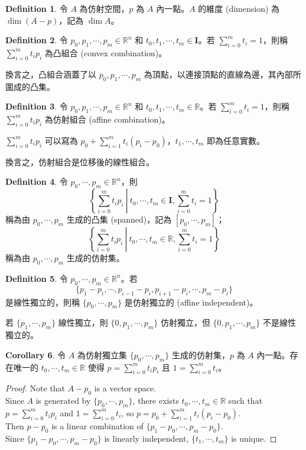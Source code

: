 \documentclass[12pt]{article}
\theoremstyle{definition}
\newtheorem{definition}{Definition}[section]
\newtheorem{corollary}[definition]{Corollary}
\newcommand\<{\langle}
\renewcommand\>{\rangle}
\begin{document}
\begin{CJK}{UTF8}{bsmi}
\begin{definition}
    令 $A$ 為仿射空間，$p$ 為 $A$ 內一點。$A$ 的維度 (dimension) 為 $\dim(A-p)$，記為 $\dim A$。
\end{definition}

\begin{definition}
    令 $p_0, p_1, \cdots, p_m\in\mathbb{R}^n$ 和 $t_0, t_1, \cdots, t_m\in\textbf{I}$。若 $\sum_{i=0}^m t_i=1$，則稱 $\sum_{i=0}^m t_i p_i$ 為凸組合 (convex combination)。
\end{definition}

換言之，凸組合涵蓋了以 $p_0, p_1, \cdots, p_m$ 為頂點，以連接頂點的直線為邊，其內部所圍成的凸集。

\begin{definition}
    令 $p_0, p_1, \cdots, p_m\in\mathbb{R}^n$ 和 $t_0, t_1, \cdots, t_m\in\mathbb{R}$。若 $\sum_{i=0}^m t_i=1$，則稱 $\sum_{i=0}^m t_i p_i$ 為仿射組合 (affine combination)。
\end{definition}

$\sum_{i=0}^m t_i p_i$ 可以寫為 $p_0+\sum_{i=1}^m t_i(p_i-p_0)$，$t_1, \cdots, t_m$ 即為任意實數。

換言之，仿射組合是位移後的線性組合。

\begin{definition}
    令 $p_0, \cdots, p_m\in\mathbb{R}^n$，則
    \[
        \left\{\sum_{i=0}^m t_i p_i\ \left|\ t_0, \cdots, t_m\in\textbf{I}, \sum_{i=0}^m t_i=1\right.\right\}
    \]
    稱為由 $p_0, \cdots, p_m$ 生成的凸集 (spanned)，記為 $[p_0, \cdots, p_m]$；
    \[
        \left\{\sum_{i=0}^m t_i p_i\ \left|\ t_0, \cdots, t_m\in\mathbb{R}, \sum_{i=0}^m t_i=1\right.\right\}
    \]
    稱為由 $p_0, \cdots, p_m$ 生成的仿射集。
\end{definition}

\begin{definition}
    令 $p_0, \cdots, p_m\in\mathbb{R}^n$。若 $$\{p_1-p_i, \cdots, p_{i-1}-p_i, p_{i+1}-p_i, \cdots, p_m-p_i\}$$ 是線性獨立的，則稱 $\{p_0, \cdots, p_m\}$ 是仿射獨立的 (affine independent)。
\end{definition}

若 $\{p_1, \cdots, p_m\}$ 線性獨立，則 $\{0, p_1, \cdots, p_m\}$ 仿射獨立，但 $\{0, p_1, \cdots, p_m\}$ 不是線性獨立的。

\begin{corollary}
    令 $A$ 為仿射獨立集 $\{p_0, \cdots, p_m\}$ 生成的仿射集，$p$ 為 $A$ 內一點。存在唯一的 $t_0, \cdots, t_m\in\mathbb{R}$ 使得 $p=\sum_{i=0}^m t_i p_i$ 且 $1=\sum_{i=0}^m t_i$。
\end{corollary}
\begin{proof}
    Note that $A-p_0$ is a vector space. \\
    Since $A$ is generated by $\{p_0, \cdots, p_m\}$, there exists $t_0, \cdots, t_m\in\mathbb{R}$ such that $p=\sum_{i=0}^m t_i p_i$ and $1=\sum_{i=0}^m t_i$, so $p=p_0+\sum_{i=1}^m t_i(p_i-p_0)$. \\
    Then $p-p_0$ is a linear combination of $\{p_1-p_0, \cdots, p_m-p_0\}$. \\
    Since $\{p_1-p_0, \cdots, p_m-p_0\}$ is linearly independent, $\{t_1, \cdots, t_m\}$ is unique.
\end{proof}


\end{CJK}
\end{document}

